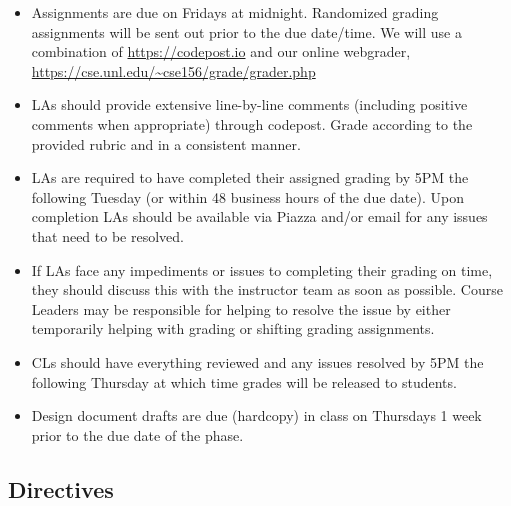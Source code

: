 \documentclass[12pt]{scrartcl}
\begin{document}
\begin{itemize}
  \item Assignments are due on Fridays at midnight.  
  Randomized grading assignments will be sent out prior to the due 
  date/time.  We will use a combination of \url{https://codepost.io}
  and our online webgrader, \url{https://cse.unl.edu/~cse156/grade/grader.php}
  
  \item LAs should provide extensive line-by-line comments (including
  positive comments when appropriate) through codepost.  Grade according
  to the provided rubric and in a consistent manner.  
    
  \item LAs are required to have completed their assigned grading by 
    5PM the following Tuesday (or within 48 business hours of the due 
    date).  Upon completion LAs should be available via Piazza and/or 
    email for any issues that need to be resolved.
  \item If LAs face any impediments or issues to completing
    their grading on time, they should discuss this with the instructor
    team as soon as possible.  Course Leaders may be 
    responsible for helping to resolve the issue by either 
    temporarily helping with grading or shifting grading assignments.  
  \item CLs should have everything reviewed and
    any issues resolved by 5PM the following Thursday at which time 
    grades will be released to students.

  \item Design document drafts are due (hardcopy) in class on 
    Thursdays 1 week prior to the due date of the phase.  

\end{itemize}

\subsection*{Directives}
\end{document}
